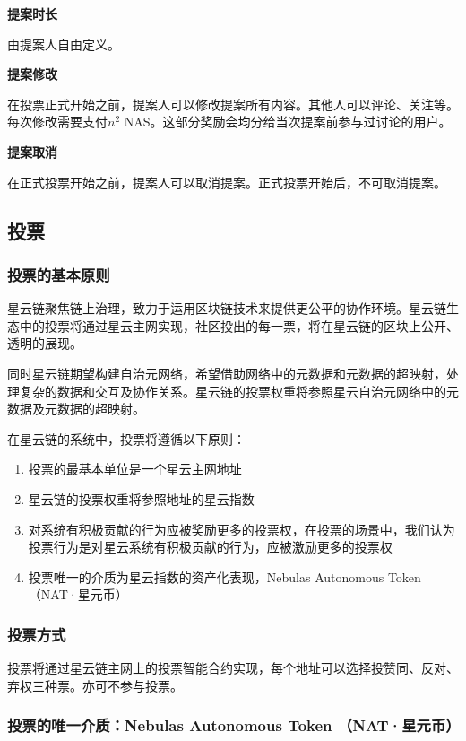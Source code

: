 \textbf{提案时长}

由提案人自由定义。

\textbf{提案修改}

在投票正式开始之前，提案人可以修改提案所有内容。其他人可以评论、关注等。每次修改需要支付$n^2$ NAS。这部分奖励会均分给当次提案前参与过讨论的用户。

\textbf{提案取消}

在正式投票开始之前，提案人可以取消提案。正式投票开始后，不可取消提案。

\subsection{投票}
\subsubsection{投票的基本原则}

星云链聚焦链上治理，致力于运用区块链技术来提供更公平的协作环境。星云链生态中的投票将通过星云主网实现，社区投出的每一票，将在星云链的区块上公开、透明的展现。

同时星云链期望构建自治元网络，希望借助网络中的元数据和元数据的超映射，处理复杂的数据和交互及协作关系。星云链的投票权重将参照星云自治元网络中的元数据及元数据的超映射。

在星云链的系统中，投票将遵循以下原则：
\begin{enumerate}
	\item 投票的最基本单位是一个星云主网地址
	\item 星云链的投票权重将参照地址的星云指数
	\item 对系统有积极贡献的行为应被奖励更多的投票权，在投票的场景中，我们认为投票行为是对星云系统有积极贡献的行为，应被激励更多的投票权
	\item 投票唯一的介质为星云指数的资产化表现，Nebulas Autonomous Token （NAT·星元币）
\end{enumerate}

\subsubsection{投票方式}

投票将通过星云链主网上的投票智能合约实现，每个地址可以选择投赞同、反对、弃权三种票。亦可不参与投票。

\subsubsection{投票的唯一介质：Nebulas Autonomous Token （NAT·星元币）}

